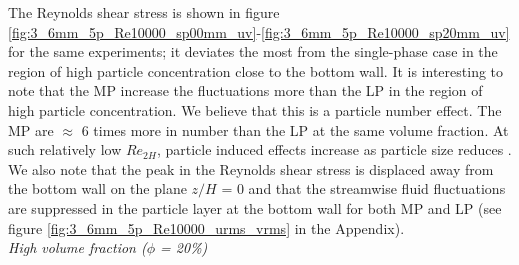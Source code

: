 \documentclass{jfm}
\begin{document}
The Reynolds shear stress is shown in figure \ref{fig:3_6mm_5p_Re10000_sp00mm_uv}-\ref{fig:3_6mm_5p_Re10000_sp20mm_uv} for the same experiments;  it deviates the most from the single-phase case in the region of high particle concentration close to the bottom wall. It is interesting to note that the MP increase the fluctuations more than the LP in the region of high particle concentration. We believe that this is a particle number effect. The MP are $\approx$ 6 times more in number than the LP at the same volume fraction. At such relatively low $Re_{2H}$, particle induced effects increase as particle size reduces \citep{lin2017effects}. We also note that the peak in the Reynolds shear stress is displaced away from the bottom wall on the plane $z/H$ = 0 and that
 the streamwise fluid fluctuations are suppressed in the particle layer at the bottom wall for both MP and LP (see figure \ref{fig:3_6mm_5p_Re10000_urms_vrms} in the Appendix).\\



{\it High volume fraction ($\phi$ = 20\%)}\\
\end{document}
